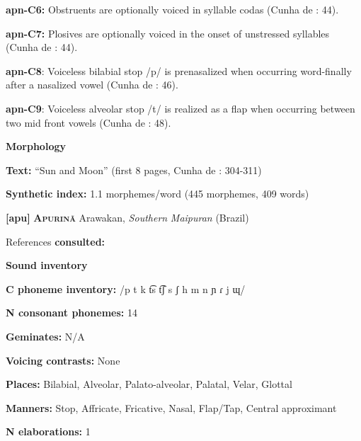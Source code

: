 \textbf{apn-C6:} Obstruents are optionally voiced in syllable codas (Cunha de \citealt{Oliveira2005}: 44).



\textbf{apn-C7:} Plosives are optionally voiced in the onset of unstressed syllables (Cunha de \citealt{Oliveira2005}: 44).



\textbf{apn-C8}: Voiceless bilabial stop /p/ is prenasalized when occurring word-finally after a nasalized vowel (Cunha de \citealt{Oliveira2005}: 46).



\textbf{apn-C9}: Voiceless alveolar stop /t/ is realized as a flap when occurring between two mid front vowels (Cunha de \citealt{Oliveira2005}: 48).



\textbf{Morphology}



\textbf{Text:} “Sun and Moon” (first 8 pages, Cunha de \citealt{Oliveira2005}: 304-311)



\textbf{Synthetic index:} 1.1 morphemes/word (445 morphemes, 409 words)



\textbf{[apu]}   \textbf{\textsc{Apurinã}}  Arawakan, \textit{Southern} \textit{Maipuran} (Brazil)



References \textbf{consulted:} \citet{Facundes2000}



\textbf{Sound inventory}



\textbf{C phoneme inventory:} /p t k t͡s t͡ʃ s ʃ h m n ɲ ɾ j ɰ/



\textbf{N consonant phonemes:} 14



\textbf{Geminates:} N/A



\textbf{Voicing contrasts:} None



\textbf{Places:} Bilabial, Alveolar, Palato-alveolar, Palatal, Velar, Glottal



\textbf{Manners:} Stop, Affricate, Fricative, Nasal, Flap/Tap, Central approximant



\textbf{N elaborations:} 1



